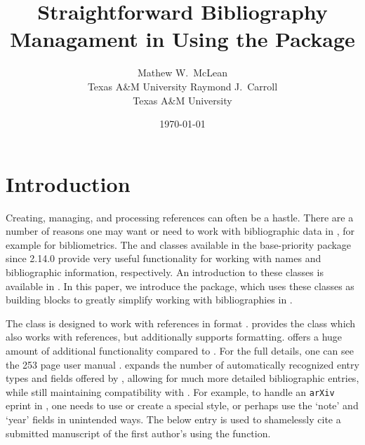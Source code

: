 \documentclass[article]{jss}\usepackage[]{graphicx}\usepackage[]{color}
\title{Straightforward Bibliography Managament in \R{} Using the \ourpkg{} Package}
\author{Mathew W.\ McLean\\ Texas A\&M University
\And
Raymond J.\ Carroll\\
Texas A\&M University
}
\date{\today}
\newcommand{\ourpkg}{\pkg{RefManageR}}
\begin{document}
\maketitle
\section{Introduction}
Creating, managing, and processing references can often be a hastle.  There are a number of reasons one may want or need to work with bibliographic data in \R{}, for example for bibliometrics.  The  and  classes available in the base-priority  package since \R{} 2.14.0 provide very useful functionality for working with names and bibliographic information, respectively.  An introduction to these classes is available in \citet{hornik2012who}.  In this paper, we introduce the \ourpkg{} package, which uses these classes as building blocks to greatly simplify working with bibliographies in \R{}.


The  class is designed to work with references in \Bibtex{} format \citep{bibtex}.  \ourpkg{} provides the  class which also works with \Bibtex{} references, but additionally supports \Biblatex{} formatting.  \Biblatex{} offers a huge amount of additional functionality compared to \Bibtex{}.  For the full details, one can see the 253 page user manual \citep{biblatex}.  \Biblatex{} expands the number of automatically recognized entry types and fields offered by \Bibtex{}, allowing for much more detailed bibliographic entries,  while still maintaining compatibility with \Bibtex{}.  For example, to handle an \texttt{arXiv} eprint in \Bibtex{}, one needs to use or create a special \Bibtex{} style, or perhaps use the `note' and `year' fields in unintended ways.  The below entry is used to shamelessly cite a submitted manuscript of the first author's using the  function. 
\end{document}
